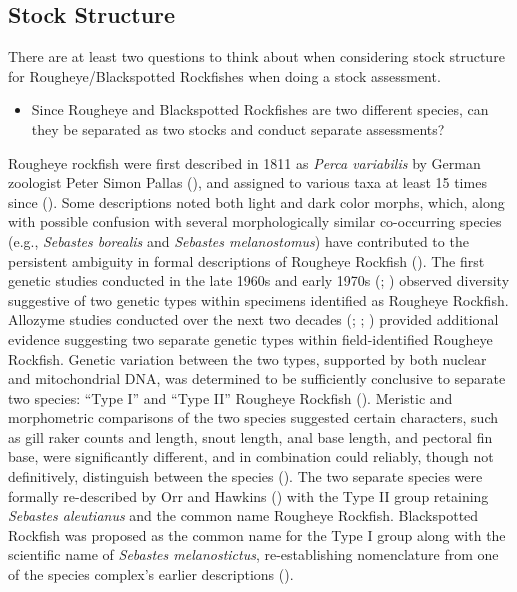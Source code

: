 \documentclass[
]{scrartcl}
\providecommand{\tightlist}{%
  \setlength{\itemsep}{0pt}\setlength{\parskip}{0pt}}\usepackage{longtable,booktabs,array}
\begin{document}
\subsection{Stock Structure}\label{sec-stock_structure}

There are at least two questions to think about when considering stock
structure for Rougheye/Blackspotted Rockfishes when doing a stock
assessment.

\begin{itemize}
\tightlist
\item
  Since Rougheye and Blackspotted Rockfishes are two different species,
  can they be separated as two stocks and conduct separate assessments?
\end{itemize}

Rougheye rockfish were first described in 1811 as \emph{Perca
variabilis} by German zoologist Peter Simon Pallas
(), and
assigned to various taxa at least 15 times since
(). Some descriptions noted both light and dark color morphs, which,
along with possible confusion with several morphologically similar
co-occurring species (e.g., \emph{Sebastes borealis} and \emph{Sebastes
melanostomus}) have contributed to the persistent ambiguity in formal
descriptions of Rougheye Rockfish (). The first genetic studies conducted in the late
1960s and early 1970s (; ) observed diversity suggestive of two genetic types within
specimens identified as Rougheye Rockfish. Allozyme studies conducted
over the next two decades (; ; )
provided additional evidence suggesting two separate genetic types
within field-identified Rougheye Rockfish. Genetic variation between the
two types, supported by both nuclear and mitochondrial DNA, was
determined to be sufficiently conclusive to separate two species: ``Type
I'' and ``Type II'' Rougheye Rockfish
().
Meristic and morphometric comparisons of the two species suggested
certain characters, such as gill raker counts and length, snout length,
anal base length, and pectoral fin base, were significantly different,
and in combination could reliably, though not definitively, distinguish
between the species (). The two separate species were formally
re-described by Orr and Hawkins ()
with the Type II group retaining \emph{Sebastes aleutianus} and the
common name Rougheye Rockfish. Blackspotted Rockfish was proposed as the
common name for the Type I group along with the scientific name of
\emph{Sebastes melanostictus}, re-establishing nomenclature from one of
the species complex's earlier descriptions
().
\end{document}
